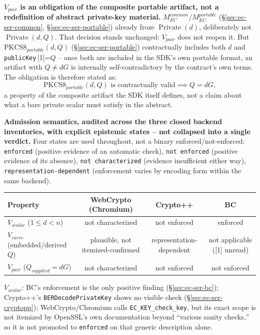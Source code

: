 \documentclass[11pt,a4paper]{article}
\begin{document}
\textbf{$V_{pair}$ is an obligation of the composite portable artifact, not a redefinition of abstract private-key material.} $M_{EC}^{common}/M_{EC}^{portable}$ (\S\ref{sec:ec-ser-common}, \S\ref{sec:ec-ser-portable}) already froze $\operatorname{Private}(d)$, deliberately not $\operatorname{Private}(d,Q)$. That decision stands unchanged: $V_{pair}$ does not reopen it. But $\text{PKCS8}_{portable}(d,Q)$ (\S\ref{sec:ec-ser-portable}) contractually includes both $d$ and \texttt{publicKey}\,[1]=$Q$ -- once both are included in the SDK's own portable format, an artifact with $Q\neq dG$ is internally self-contradictory by the contract's own terms. The obligation is therefore stated as:
\[
\text{PKCS8}_{portable}(d,Q) \text{ is contractually valid} \implies Q=dG,
\]
a property of the composite artifact the SDK itself defines, not a claim about what a bare private scalar must satisfy in the abstract.

\textbf{Admission semantics, audited across the three closed backend inventories, with explicit epistemic states -- not collapsed into a single verdict.} Four states are used throughout, not a binary enforced/not-enforced: \texttt{enforced} (positive evidence of an automatic check), \texttt{not enforced} (positive evidence of its absence), \texttt{not characterized} (evidence insufficient either way), \texttt{representation-dependent} (enforcement varies by encoding form within the same backend).

\begin{center}
\begin{tabular}{@{}lccc@{}}
\toprule
Property & WebCrypto (Chromium) & Crypto++ & BC \\
\midrule
$V_{scalar}$ ($1\le d<n$) & not characterized & not enforced & enforced \\
$V_{curve}$ (embedded/derived $Q$) & plausible, not itemized-confirmed & representation-dependent & not applicable ([1] unread) \\
$V_{pair}$ ($Q_{supplied}=dG$) & not characterized & not enforced & not enforced \\
\bottomrule
\end{tabular}
\end{center}

\textbf{$V_{scalar}$}: BC's enforcement is the only positive finding (\S\ref{sec:ec-ser-bc}); Crypto++'s \texttt{BERDecodePrivateKey} shows no visible check (\S\ref{sec:ec-ser-cryptopp}); WebCrypto/Chromium calls \texttt{EC\_KEY\_check\_key}, but its exact scope is not itemized by OpenSSL's own documentation beyond ``various sanity checks,'' so it is not promoted to \texttt{enforced} on that generic description alone.
\end{document}
